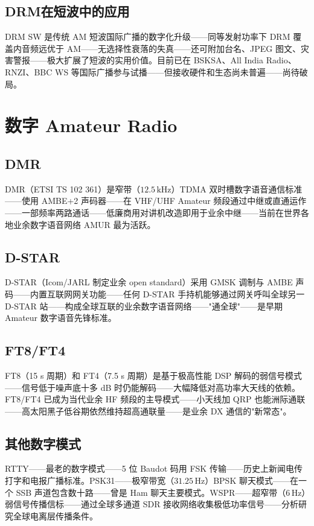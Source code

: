 \documentclass[12pt,UTF8]{ctexbook}
\begin{document}
\subsection{DRM在短波中的应用}

DRM SW 是传统 AM 短波国际广播的数字化升级——同等发射功率下 DRM 覆盖内音频远优于 AM——无选择性衰落的失真——还可附加台名、JPEG 图文、灾害警报——极大扩展了短波的实用价值。目前已在 BSKSA、All India Radio、RNZI、BBC WS 等国际广播参与试播——但接收硬件和生态尚未普遍——尚待破局。

\section{数字 Amateur Radio}
\label{sec:digital_ham}

\subsection{DMR}

DMR（ETSI TS 102 361）是窄带（$12.5\,\mathrm{kHz}$）TDMA 双时槽数字语音通信标准——使用 AMBE+2 声码器——在 VHF/UHF Amateur 频段通过中继或直通运作——一部频率两路通话——低廉商用对讲机改造即用于业余中继——当前在世界各地业余数字语音网络 AMUR 最为活跃。

\subsection{D-STAR}

D-STAR（Icom/JARL 制定业余 open standard）采用 GMSK 调制与 AMBE 声码——内置互联网网关功能——任何 D-STAR 手持机能够通过网关呼叫全球另一 D-STAR 站——构成全球互联的业余数字语音网络——"通全球"——是早期 Amateur 数字语音先锋标准。

\subsection{FT8/FT4}

FT8（15 s 周期）和 FT4（7.5 s 周期）是基于极高性能 DSP 解码的弱信号模式——信号低于噪声底十多 dB 时仍能解码——大幅降低对高功率大天线的依赖。FT8/FT4 已成为当代业余 HF 频段的主导模式——小天线加 QRP 也能洲际通联——高太阳黑子低谷期依然维持超高通联量——是业余 DX 通信的"新常态"。

\subsection{其他数字模式}

RTTY——最老的数字模式——5 位 Baudot 码用 FSK 传输——历史上新闻电传打字和电报广播标准。PSK31——极窄带宽（$31.25\,\mathrm{Hz}$）BPSK 聊天模式——在一个 SSB 声道包含数十路——曾是 Ham 聊天主要模式。WSPR——超窄带（$6\,\mathrm{Hz}$）弱信号传播信标——通过全球多通道 SDR 接收网络收集极低功率信号——分析研究全球电离层传播条件。
\end{document}
